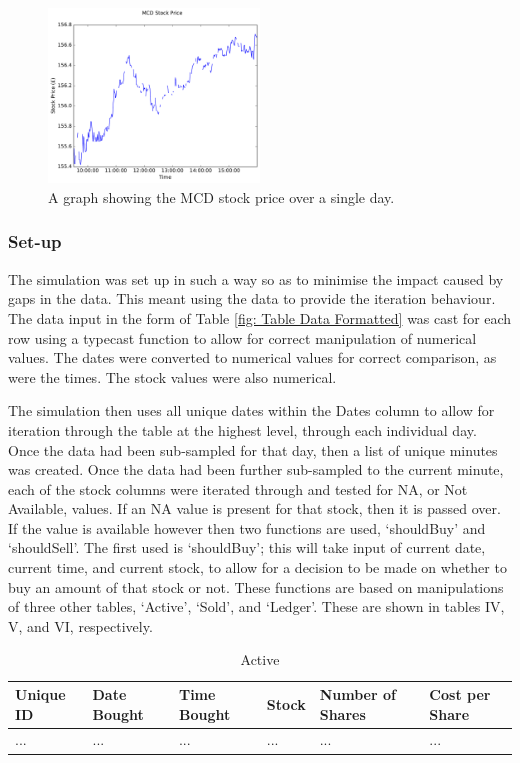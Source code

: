 \documentclass[conference]{IEEEtran}
\begin{document}
\begin{figure}
\includegraphics[width=0.5\textwidth, angle=0]{MCD.pdf}
\caption{A graph showing the MCD stock price over a single day.}
\label{fig:MCD Stock Price}
\end{figure}

\subsubsection{Set-up}

The simulation was set up in such a way so as to minimise the impact caused by gaps in the data. This meant using the data to provide the iteration behaviour. The data input in the form of Table \ref{fig: Table Data Formatted} was cast for each row using a typecast function to allow for correct manipulation of numerical values. The dates were converted to numerical values for correct comparison, as were the times. The stock values were also numerical. 

The simulation then uses all unique dates within the Dates column to allow for iteration through the table at the highest level, through each individual day. Once the data had been sub-sampled for that day, then a list of unique minutes was created. Once the data had been further sub-sampled to the current minute, each of the stock columns were iterated through and tested for NA, or Not Available, values. If an NA value is present for that stock, then it is passed over. If the value is available however then two functions are used, `shouldBuy' and `shouldSell'. The first used is `shouldBuy'; this will take input of current date, current time, and current stock, to allow for a decision to be made on whether to buy an amount of that stock or not. These functions are based on manipulations of three other tables, `Active', `Sold', and `Ledger'. These are shown in tables IV, V, and VI, respectively.

\begin{table}
\centering
\begin{tabu}{ |p{2.25cm}|p{2.25cm}|p{2.25cm}|p{2.25cm}|p{2.25cm}|p{2.25cm}| }\hline\hline
Unique ID & Date Bought & Time Bought & Stock & Number of Shares & Cost per Share \\ \hline
... & ... & ... & ... & ... & ... \\ \hline
\end{tabu}
\vspace{2 mm}
\caption{Active}
\label{fig: Active}
\end{table}
\end{document}
